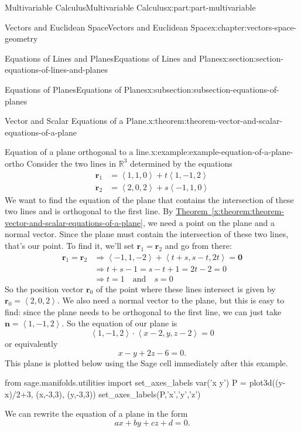 \documentclass[twoside,10pt,]{tufte-book}
\newcommand{\xreffont}{\relax}
\numberwithin{equation}{part}
\newcommand{\RR}{\mathbb{R}}
\newcommand{\dotprod}[1]{\left\langle #1 \right\rangle}
\begin{document}
\begin{partptx}{Multivariable Calculus}{}{Multivariable Calculus}{}{}{x:part:part-multivariable}
\begin{chapterptx}{Vectors and Euclidean Space}{}{Vectors and Euclidean Space}{}{}{x:chapter:vectors-space-geometry}
\begin{sectionptx}{Equations of Lines and Planes}{}{Equations of Lines and Planes}{}{}{x:section:section-equations-of-lines-and-planes}
\begin{subsectionptx}{Equations of Planes}{}{Equations of Planes}{}{}{x:subsection:subsection-equations-of-planes}
\begin{theorem}{Vector and Scalar Equations of a Plane.}{}{x:theorem:theorem-vector-and-scalar-equations-of-a-plane}
\end{theorem}
\begin{example}{Equation of a plane orthogonal to a line.}{x:example:example-equation-of-a-plane-ortho}%
Consider the two lines in \(\RR^{3}\) determined by the equations%
%
\begin{align*}
\mathbf{r}_{1} & = \dotprod{1,1,0} + t\dotprod{1,-1,2} \\
\mathbf{r}_{2} & = \dotprod{2,0,2} + s\dotprod{-1,1,0} 
\end{align*}
We want to find the equation of the plane that contains the intersection of these two lines and is orthogonal to the first line. By \hyperref[x:theorem:theorem-vector-and-scalar-equations-of-a-plane]{Theorem~{\xreffont\ref{x:theorem:theorem-vector-and-scalar-equations-of-a-plane}}}, we need a point on the plane and a normal vector. Since the plane must contain the intersection of these two lines, that's our point. To find it, we'll set \(\mathbf{r}_{1} = \mathbf{r}_{2}\) and go from there:%
%
\begin{align*}
\mathbf{r}_{1}=\mathbf{r}_{2} & \Rightarrow \dotprod{-1,1,-2} + \dotprod{t+s,s-t,2t} = \mathbf{0} \\
& \Rightarrow t+s-1 = s-t+1 = 2t-2 = 0 \\
& \Rightarrow t = 1\quad\text{and}\quad s=0 
\end{align*}
So the position vector \(\mathbf{r}_{0}\) of the point where these lines intersect is given by \(\mathbf{r}_{0} = \dotprod{2,0,2}\). We also need a normal vector to the plane, but this is easy to find: since the plane needs to be orthogonal to the first line, we can just take \(\mathbf{n} = \dotprod{1,-1,2}\). So the equation of our plane is%
%
\begin{equation*}
\dotprod{1,-1,2}\cdot\dotprod{x-2,y,z-2} = 0
\end{equation*}
or equivalently%
%
\begin{equation*}
x-y+2z -6 = 0.
\end{equation*}
This plane is plotted below using the Sage cell immediately after this example.%
\end{example}
\begin{sageinput}
from sage.manifolds.utilities import set_axes_labels
var('x y')
P = plot3d((y-x)/2+3, (x,-3,3), (y,-3,3))
set_axes_labels(P,'x','y','z')
\end{sageinput}
We can rewrite the equation of a plane in the form%
%
\begin{equation*}
ax+by+cz+d = 0.
\end{equation*}

\end{subsectionptx}
\end{sectionptx}
\end{chapterptx}
\end{partptx}
\end{document}
